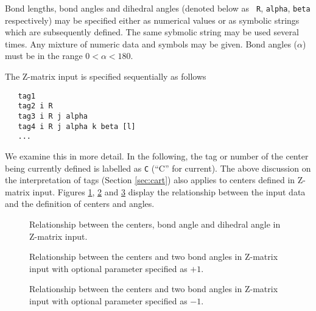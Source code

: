 Bond lengths, bond angles and dihedral angles (denoted below as {\tt
  R}, {\tt alpha}, {\tt beta} respectively) may be specified either as
numerical values or as symbolic strings which are subsequently
defined.  The same sybmolic string may be used several times.  Any
mixture of numeric data and symbols may be given. Bond angles
($\alpha$) must be in the range $0 < \alpha < 180$.

The Z-matrix input is specified sequentially as follows
\begin{verbatim}
   tag1
   tag2 i R
   tag3 i R j alpha
   tag4 i R j alpha k beta [l]
   ...
\end{verbatim}

We examine this in more detail.  In the following, the tag or number
of the center being currently defined is labelled as \verb+C+ (``C''
for current).  The above discussion on the interpretation of tags
(Section \ref{sec:cart}) also applies to centers defined in Z-matrix
input.  Figures \ref{fig:zmat1}, \ref{fig:zmat2} and \ref{fig:zmat3}
display the relationship between the input data and the definition of
centers and angles.

\begin{figure}[htbp]
\centering
{}

\caption{\label{fig:zmat1} Relationship between the centers, bond angle
and dihedral angle in Z-matrix input.}
\end{figure}

\begin{figure}[htbp]
\centering
{}

\caption{\label{fig:zmat2} Relationship between the centers and two
  bond angles in Z-matrix input with optional parameter specified as $+1$.}
\end{figure}

\begin{figure}[htbp]
\centering
{}

\caption{\label{fig:zmat3} Relationship between the centers and two
  bond angles in Z-matrix input with optional parameter specified as $-1$.}
\end{figure}

